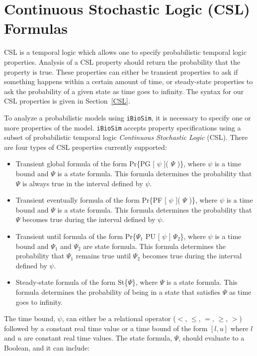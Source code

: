 \documentclass[titlepage,11pt]{article}
\begin{document}
\section{\label{CSL}Continuous Stochastic Logic (CSL) Formulas}

CSL is a temporal logic which allows one to specify probabilistic temporal logic properties.  Analysis of a CSL property should return the probability that the property is true.  These properties can either be transient properties to ask if something happens within a certain amount of time, or steady-state properties to ask the probability of a given state as time goes to infinity.  The syntax for our CSL properties is given in Section~\ref{CSL}.

\noindent
To analyze a probabilistic models using {\tt iBioSim}, it is necessary to specify one or more properties of
the model.  {\tt iBioSim} accepts property specifications using a subset of probabilistic temporal logic \emph{Continuous Stochastic Logic} (CSL).  There are four types of CSL properties currently supported:
\begin{itemize}
\item Transient global formula of the form Pr\{PG [ $\psi$ ]( $\Psi$ )\}, where $\psi$ is a time bound and $\Psi$ is a state formula.  This formula determines the probability that $\Psi$ is always true in the interval defined by $\psi$.
\item Transient eventually formula of the form Pr\{PF [ $\psi$ ]( $\Psi$ )\}, where $\psi$ is a time bound and $\Psi$ is a state formula.  This formula determines the probability that $\Psi$ becomes true during the interval defined by $\psi$.
\item Transient until formula of the form Pr\{$\Psi_1$ PU [ $\psi$ ] $\Psi_2$\}, where $\psi$ is a time bound and $\Psi_1$ and $\Psi_2$ are state formula.  This formula determines the probability that $\Psi_1$ remains true until $\Psi_2$ becomes true during the interval defined by $\psi$.
\item Steady-state formula of the form St\{$\Psi$\}, where $\Psi$ is a state formula.  This formula determines the probability of being in a state that satisfies $\Psi$ as time goes to infinity.
\end{itemize}
The time bound, $\psi$, can either be a relational operator ($<$, $\leq$, $=$, $\geq$, $>$) followed by a constant real time value or a time bound of the form $[ l, u ]$ where $l$ and $u$
are constant real time values.  The state formula, $\Psi$, should evaluate to a Boolean, and it can include:
\end{document}
